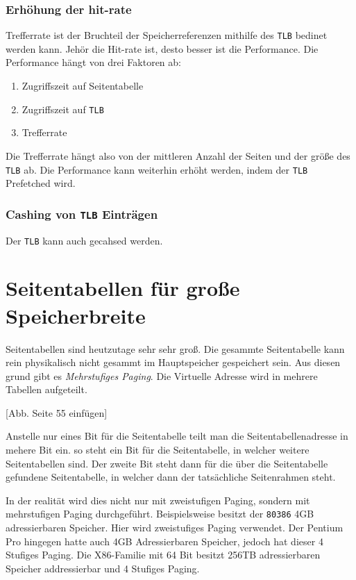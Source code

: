 \subsubsection{Erhöhung der hit-rate}

Trefferrate ist der Bruchteil der Speicherreferenzen mithilfe des \texttt{TLB} bedinet werden kann. Jehör die Hit-rate ist, desto besser ist die Performance. Die Performance hängt von drei Faktoren ab:

\begin{enumerate}
    \item Zugriffszeit auf Seitentabelle
    \item Zugriffszeit auf \texttt{TLB}
    \item Trefferrate
\end{enumerate}

Die Trefferrate hängt also von der mittleren Anzahl der Seiten und der größe des \texttt{TLB} ab. Die Performance kann weiterhin erhöht werden, indem der \texttt{TLB} Prefetched wird.

\subsubsection*{Cashing von \texttt{TLB} Einträgen}

Der \texttt{TLB} kann auch gecahsed werden.

\section{Seitentabellen für große Speicherbreite}

Seitentabellen sind heutzutage sehr sehr groß. Die gesammte Seitentabelle kann rein physikalisch nicht gesammt im Hauptspeicher gespeichert sein. Aus diesen grund gibt es \textit{Mehrstufiges Paging}. Die Virtuelle Adresse wird in mehrere Tabellen aufgeteilt.

[Abb. Seite 55 einfügen]

Anstelle nur eines Bit für die Seitentabelle teilt man die Seitentabellenadresse in mehere Bit ein. so steht ein Bit für die Seitentabelle, in welcher weitere Seitentabellen sind. Der zweite Bit steht dann für die über die Seitentabelle gefundene Seitentabelle, in welcher dann der tatsächliche Seitenrahmen steht.

In der realität wird dies nicht nur mit zweistufigen Paging, sondern mit mehrstufigen Paging durchgeführt. Beispielsweise besitzt der \texttt{80386} 4GB adressierbaren Speicher. Hier wird zweistufiges Paging verwendet. Der Pentium Pro hingegen hatte auch 4GB Adressierbaren Speicher, jedoch hat dieser 4 Stufiges Paging. Die X86-Familie mit 64 Bit besitzt 256TB adressierbaren Speicher addressierbar und 4  Stufiges Paging.

